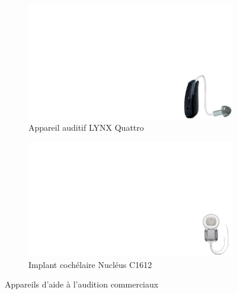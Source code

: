 \begin{table}[!htbp]
	\begin{minipage}[c]{0.5\textwidth}
		\begin{figure}[H]
			\begin{center}
				\begin{subfigure}[t]{0.49\textwidth}
					\captionsetup{justification=centering}
					\includegraphics[trim={25cm 0cm 0cm 11cm},clip,width=\textwidth]{../Chap1/Figure/hearing_aid_Resound.pdf}
					\caption{Appareil auditif LYNX Quattro \cite{Quattro2019}}
					\label{fig:hearing_aid_Resound}
				\end{subfigure}
				\hfillx
				\begin{subfigure}[t]{0.49\textwidth}
					\captionsetup{justification=centering}
					\includegraphics[trim={27cm 0cm 0cm 12cm},clip,width=\textwidth]{../Chap1/Figure/nucleus_Cochlear.pdf}
					\caption{Implant cochélaire Nucléus C1612 \cite{COCHLEAR}}
					\label{fig:implant_Cochlear}
				\end{subfigure}
				\caption{Appareils d'aide à l'audition \mbox{commerciaux}}
				\label{fig:appareils_commerciaux}
			\end{center}

\end{figure}
\end{minipage}
\end{table}
